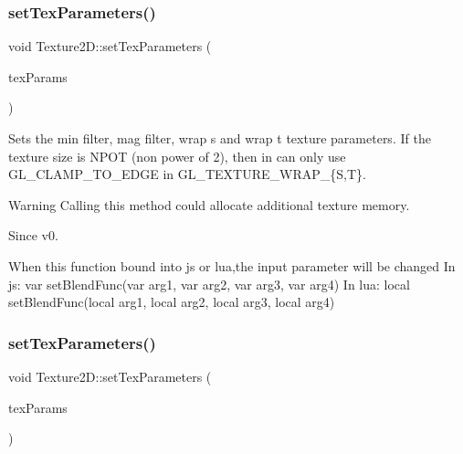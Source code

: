 \subsubsection{\texorpdfstring{set\+Tex\+Parameters()}{setTexParameters()}\hspace{0.1cm}{\footnotesize\ttfamily [1/4]}}
{\footnotesize\ttfamily void Texture2\+D\+::set\+Tex\+Parameters (\begin{DoxyParamCaption}\item[{const \hyperlink{classTexture2D_af2ea04a3dfcdf7274db17dda4bd555e3}{Tex\+Params} \&}]{tex\+Params }\end{DoxyParamCaption})}

Sets the min filter, mag filter, wrap s and wrap t texture parameters. If the texture size is N\+P\+OT (non power of 2), then in can only use G\+L\+\_\+\+C\+L\+A\+M\+P\+\_\+\+T\+O\+\_\+\+E\+D\+GE in G\+L\+\_\+\+T\+E\+X\+T\+U\+R\+E\+\_\+\+W\+R\+A\+P\+\_\+\{S,T\}.

\begin{DoxyWarning}{Warning}
Calling this method could allocate additional texture memory.
\end{DoxyWarning}
\begin{DoxySince}{Since}
v0. 
\begin{DoxyCode}
When \textcolor{keyword}{this} \textcolor{keyword}{function} bound into js or lua,the input parameter will be changed
In js: var setBlendFunc(var arg1, var arg2, var arg3, var arg4)
In lua: local setBlendFunc(local arg1, local arg2, local arg3, local arg4)
\end{DoxyCode}
 
\end{DoxySince}
\mbox{\label{classTexture2D_acdea523f6f6306462129e45b185205e4}} 
\subsubsection{\texorpdfstring{set\+Tex\+Parameters()}{setTexParameters()}\hspace{0.1cm}{\footnotesize\ttfamily [2/4]}}
{\footnotesize\ttfamily void Texture2\+D\+::set\+Tex\+Parameters (\begin{DoxyParamCaption}\item[{const \hyperlink{classTexture2D_af2ea04a3dfcdf7274db17dda4bd555e3}{Tex\+Params} \&}]{tex\+Params }\end{DoxyParamCaption})}

